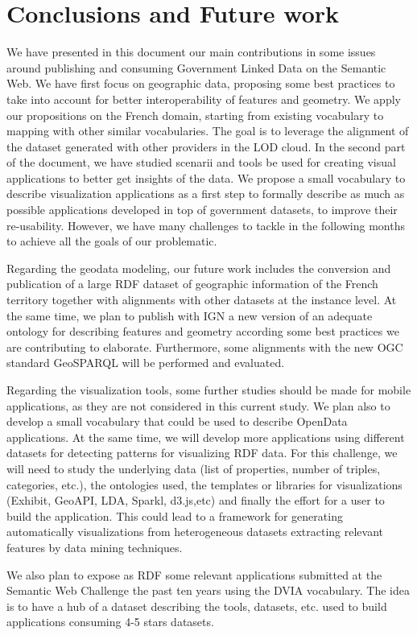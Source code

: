 \documentclass[a4paper,11pt]{report}
\begin{document}
   


\chapter{Conclusions and Future work}

We have presented in this document our main contributions in some issues around publishing and consuming Government Linked Data on the Semantic Web. We have first focus on geographic data, proposing some best practices to take into account for better interoperability of features and geometry.
We apply our propositions on the French domain, starting from existing vocabulary to mapping with other similar vocabularies. The goal is to leverage the alignment of the dataset generated with other providers in the LOD cloud. In the second part of the document, we have studied scenarii and tools 
be used for creating visual applications to better get insights of the data. We propose a small vocabulary to describe visualization applications as a first step to formally describe as much as possible applications developed in top of government datasets, to improve their re-usability. However, we have many challenges to tackle in the following months to achieve all the goals of our problematic.       

Regarding the geodata modeling, our future work includes the conversion and publication of a large RDF dataset of geographic information of the French territory together with alignments with other datasets at the instance level. At the same time, we plan to publish with IGN a new version of an adequate ontology for describing features and geometry according some best practices we are contributing to elaborate. Furthermore, some alignments with the new OGC standard GeoSPARQL will be performed and evaluated.

Regarding the visualization tools, some further studies should be made for mobile applications, as they are not considered in this current study. We plan also to develop a small vocabulary that could be used to describe OpenData applications. At the same time, we will develop  more applications using different datasets for detecting patterns for visualizing RDF data. For this challenge, we will need to study the underlying data (list of properties, number of triples, categories, etc.), the ontologies used, the templates or libraries for visualizations (Exhibit, GeoAPI, LDA, Sparkl, d3.js,etc) and finally the effort for a user to build the application. This could lead to a framework for generating automatically visualizations from heterogeneous datasets extracting relevant features by data mining techniques. 

We also plan to expose as RDF some relevant applications submitted at the Semantic Web Challenge the past ten years using the DVIA vocabulary. The idea is to have a hub of a dataset describing the tools, datasets, etc.  used to build  applications consuming 4-5 stars datasets.


\nocite{*}



\end{document}

